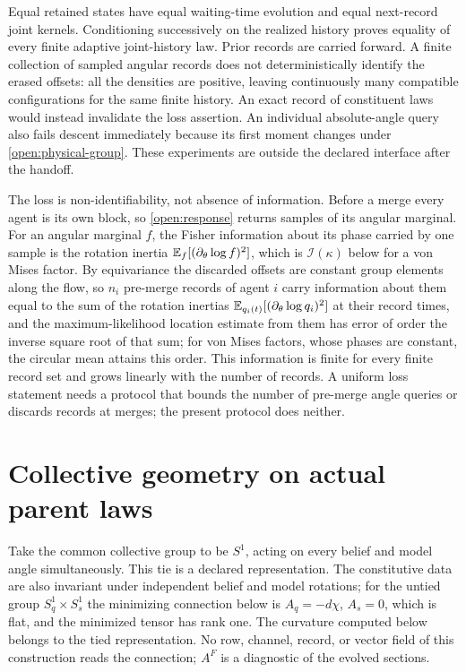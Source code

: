 Equal retained states have equal waiting-time evolution and equal next-record joint kernels. Conditioning successively on the realized history proves equality of every finite adaptive joint-history law. Prior records are carried forward. A finite collection of sampled angular records does not deterministically identify the erased offsets: all the densities are positive, leaving continuously many compatible configurations for the same finite history. An exact record of constituent laws would instead invalidate the loss assertion. An individual absolute-angle query also fails descent immediately because its first moment changes under \cref{open:physical-group}. These experiments are outside the declared interface after the handoff.

The loss is non-identifiability, not absence of information. Before a merge every agent is its own block, so \cref{open:response} returns samples of its angular marginal. For an angular marginal $f$, the Fisher information about its phase carried by one sample is the rotation inertia $\mathbb E_f[(\partial_\theta\log f)^2]$, which is $\mathcal I(\kappa)$ below for a von Mises factor. By equivariance the discarded offsets are constant group elements along the flow, so $n_i$ pre-merge records of agent $i$ carry information about them equal to the sum of the rotation inertias $\mathbb E_{q_i(t)}[(\partial_\theta\log q_i)^2]$ at their record times, and the maximum-likelihood location estimate from them has error of order the inverse square root of that sum; for von Mises factors, whose phases are constant, the circular mean attains this order. This information is finite for every finite record set and grows linearly with the number of records. A uniform loss statement needs a protocol that bounds the number of pre-merge angle queries or discards records at merges; the present protocol does neither.

\section{Collective geometry on actual parent laws}

Take the common collective group to be $S^1$, acting on every belief and model angle simultaneously. This tie is a declared representation. The constitutive data are also invariant under independent belief and model rotations; for the untied group $S^1_q\times S^1_s$ the minimizing connection below is $A_q=-d\chi$, $A_s=0$, which is flat, and the minimized tensor has rank one. The curvature computed below belongs to the tied representation. No row, channel, record, or vector field of this construction reads the connection; $A^F$ is a diagnostic of the evolved sections.

